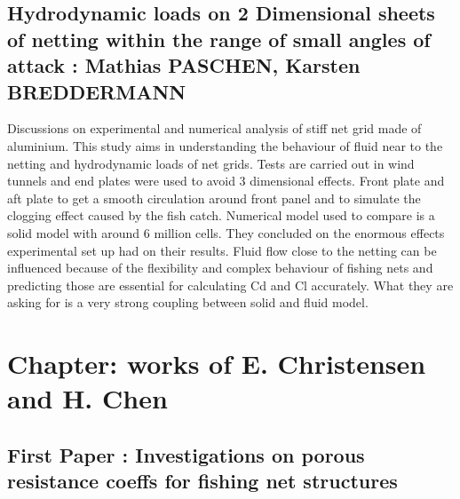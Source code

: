 \documentclass[letterpaper,12pt]{article}
\begin{document}
\subsection{Hydrodynamic loads on 2 Dimensional sheets of netting within the range of small angles of attack : Mathias PASCHEN, Karsten BREDDERMANN}
Discussions on experimental and numerical analysis of stiff net grid made of aluminium. This study aims in understanding the behaviour of fluid near to the netting and hydrodynamic loads of net grids. Tests are carried out in wind tunnels and end plates were used to avoid 3 dimensional effects. Front plate and aft plate to get a smooth circulation around front panel and to simulate the clogging effect caused by the fish catch. Numerical model used to compare is a solid model with around 6 million cells. They concluded on the enormous effects experimental set up had on their results. Fluid flow close to the netting can be influenced because of the flexibility and complex behaviour of fishing nets and predicting those are essential for  calculating  Cd and Cl accurately. What they are asking for is a very strong coupling between solid and fluid model.



\section{Chapter: works of E. Christensen and H. Chen}

\subsection{First Paper : Investigations on porous resistance coeffs for fishing net structures}
\end{document}
